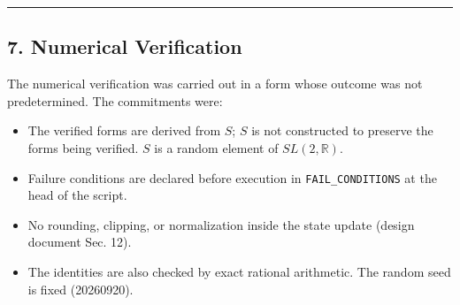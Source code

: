 \documentclass[
  a4paper,
]{article}
\providecommand{\tightlist}{%
  \setlength{\itemsep}{0pt}\setlength{\parskip}{0pt}}
\begin{document}
\begin{center}\rule{0.5\linewidth}{0.5pt}\end{center}

\subsection{7. Numerical Verification}\label{numerical-verification}

The numerical verification was carried out in a form whose outcome was
not predetermined. The commitments were:

\begin{itemize}
\tightlist
\item
  The verified forms are derived from \(S\); \(S\) is not constructed to
  preserve the forms being verified. \(S\) is a random element of
  \(SL(2,\mathbb R)\).
\item
  Failure conditions are declared before execution in
  \texttt{FAIL\_CONDITIONS} at the head of the script.
\item
  No rounding, clipping, or normalization inside the state update
  (design document Sec. 12).
\item
  The identities are also checked by exact rational arithmetic. The
  random seed is fixed (20260920).
\end{itemize}
\end{document}
